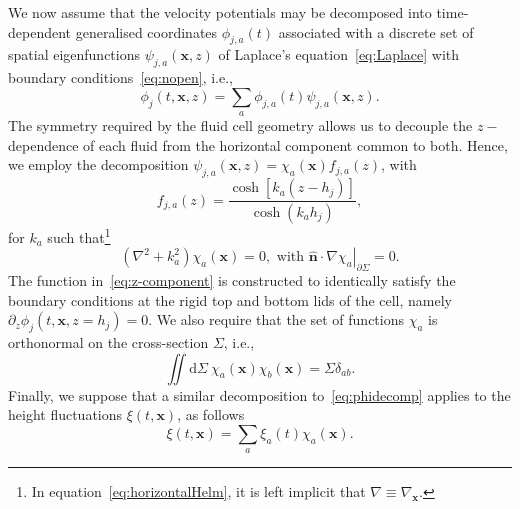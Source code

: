\documentclass[a4paper]{jpconf}
\newcommand{\unvec}[1]{\bm{\hat{#1}}}
\newcommand{\dd}{\mathrm{d}}
\begin{document}
We now assume that the velocity potentials may be decomposed into time-dependent generalised coordinates $\phi_{j,a}(t)$ associated with a discrete set of spatial eigenfunctions $\psi_{j,a}(\bm{x},z)$ of Laplace's equation~\eqref{eq:Laplace} with boundary conditions~\eqref{eq:nopen}, i.e.,
\begin{equation}
    \label{eq:phidecomp}
    \phi_j(t,\bm{x},z) = \sum_a \phi_{j,a}(t)\psi_{j,a}(\bm{x},z).
\end{equation}
The symmetry required by the fluid cell geometry allows us to decouple the $z-$dependence of each fluid from the horizontal component common to both. Hence, we employ the decomposition $\psi_{j,a}(\bm{x},z)=\chi_a(\bm{x})f_{j,a}(z)$, with 
\begin{equation}
    \label{eq:z-component}
    f_{j,a}(z)=\frac{\cosh[k_a(z-h_j)]}{\cosh(k_ah_j)},
\end{equation}
for $k_a$ such that\footnote{In equation~\eqref{eq:horizontalHelm}, it is left implicit that $\nabla\equiv\nabla_{\bm{x}}$.}
\begin{equation}
    \label{eq:horizontalHelm}
    \left(\nabla^2+k_a^2\right)\chi_a(\bm{x})=0,\text{ with }\left.\unvec{n}\cdot\nabla\chi_a\right|_{\partial \Sigma}=0.
\end{equation}
The function in~\eqref{eq:z-component} is constructed to identically satisfy the boundary conditions at the rigid top and bottom lids of the cell, namely $\partial_z \phi_j(t,\bm{x},z=h_j)=0$. We also require that the set of functions $\chi_a$ is orthonormal on the cross-section $\Sigma$, i.e.,
\begin{equation}
    \label{eq:normalisation}
    \iint\dd\Sigma~\chi_a(\bm{x})\chi_b(\bm{x}) = \Sigma \delta_{ab}.
\end{equation}
Finally, we suppose that a similar decomposition to~\eqref{eq:phidecomp} applies to the height fluctuations $\xi(t,\bm{x})$, as follows
\begin{equation}
    \label{eq:xidecomp}
    \xi(t,\bm{x})=\sum_{a} \xi_{a}(t)\chi_{a}(\bm{x}). 
\end{equation}
\end{document}
